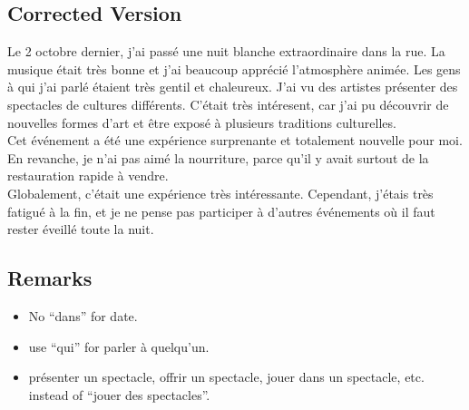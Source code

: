 \documentclass{book}
\begin{document}
        \subsection*{Corrected Version}
            Le 2 octobre dernier, j'ai passé une nuit blanche extraordinaire dans la rue. La musique était très bonne et j'ai beaucoup apprécié l'atmosphère animée.
            Les gens à qui j'ai parlé étaient très gentil et chaleureux. J'ai vu des artistes présenter des spectacles de cultures différents. 
            C'était très intéresent, car j'ai pu découvrir de nouvelles formes d'art et être exposé à plusieurs traditions culturelles. \\
            Cet événement a été une expérience surprenante et totalement nouvelle pour moi. 
            En revanche, je n'ai pas aimé la nourriture, parce qu'il y avait surtout de la restauration rapide à vendre. \\
            Globalement, c'était une expérience très intéressante. Cependant, j'étais très fatigué à la fin, et je ne pense pas participer à d'autres événements où il faut rester éveillé toute la nuit.
        
        \subsection*{Remarks}
            \begin{itemize}
                \item No ``dans'' for date.
                \item use ``qui'' for parler à quelqu'un.
                \item présenter un spectacle, offrir un spectacle, jouer dans un spectacle, etc. instead of ``jouer des spectacles''.
            \end{itemize}
\end{document}
